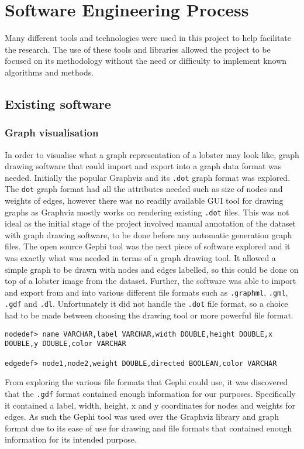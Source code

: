 \section{Software Engineering Process}
Many different tools and technologies were used in this project to help facilitate the research. The use of these tools and libraries allowed the project to be focused on its methodology without the need or difficulty to implement known algorithms and methods. 
\subsection{Existing software}

\subsubsection{Graph visualisation}
In order to visualise what a graph representation of a lobster may look like, graph drawing software that could import and export into a graph data format was needed. Initially the popular Graphviz and its \texttt{.dot} graph format \cite{graphviz-dot} was explored. The \texttt{dot} graph format had all the attributes needed such as size of nodes and weights of edges, however there was no readily available GUI tool for drawing graphs as Graphviz mostly works on rendering existing \texttt{.dot} files. This was not ideal as the initial stage of the project involved manual annotation of the dataset with graph drawing software, to be done before any automatic generation graph files. 
\n
The open source Gephi \cite{gephi} tool was the next piece of software explored and it was exactly what was needed in terms of a graph drawing tool. It allowed a simple graph to be drawn with nodes and edges labelled, so this could be done on top of a lobster image from the dataset. Further, the software was able to import and export from and into various different file formats such as \texttt{.graphml}, \texttt{.gml}, \texttt{.gdf} and \texttt{.dl}. Unfortunately it did not handle the \texttt{.dot} file format, so a choice had to be made between choosing the drawing tool or more powerful file format. 
\begin{lstlisting}[caption={Header formats for \texttt{.gdf} files showing the kind of node and edge data it could keep.}]
nodedef> name VARCHAR,label VARCHAR,width DOUBLE,height DOUBLE,x DOUBLE,y DOUBLE,color VARCHAR

edgedef> node1,node2,weight DOUBLE,directed BOOLEAN,color VARCHAR
\end{lstlisting}
From exploring the various file formats that Gephi could use, it was discovered that the \texttt{.gdf} format contained enough information for our purposes. Specifically it contained a label, width, height, x and y coordinates for nodes and weights for edges. As such the Gephi tool was used over the Graphviz library and graph format due to its ease of use for drawing and file formats that contained enough information for its intended purpose.

